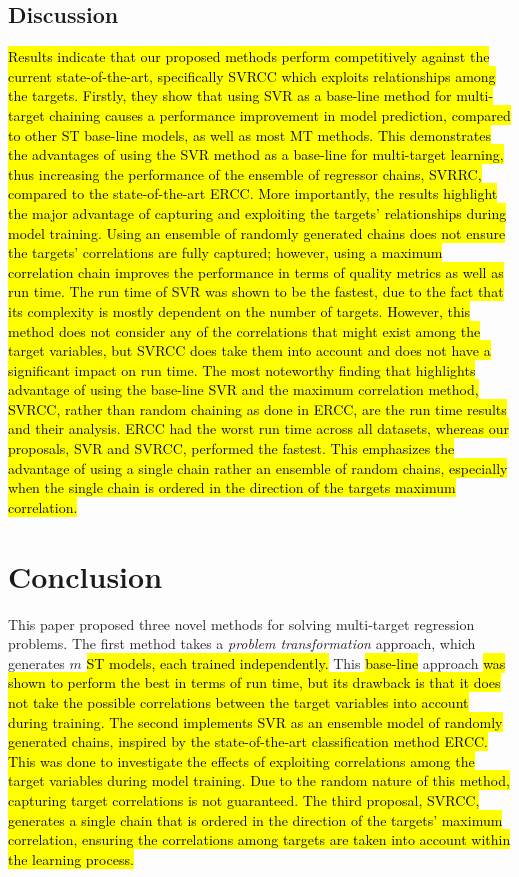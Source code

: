 \documentclass[preprint,12pt]{elsarticle}
\begin{document}
\subsection{Discussion}\label{sec:discussion}
\hl{Results indicate that our proposed methods perform competitively against the current state-of-the-art, specifically SVRCC which exploits relationships among the targets. Firstly, they show that using SVR as a base-line method for multi-target chaining causes a performance improvement in model prediction, compared to other ST base-line models, as well as most MT methods. This demonstrates the advantages of using the SVR method as a base-line for multi-target learning, thus increasing the performance of the ensemble of regressor chains, SVRRC, compared to the state-of-the-art ERCC. More importantly, the results highlight the major advantage of capturing and exploiting the targets' relationships during model training. Using an ensemble of randomly generated chains does not ensure the targets' correlations are fully captured; however, using a maximum correlation chain improves the performance in terms of quality metrics as well as run time. The run time of SVR was shown to be the fastest, due to the fact that its complexity is mostly dependent on the number of targets. However, this method does not consider any of the correlations that might exist among the target variables, but SVRCC does take them into account and does not have a significant impact on run time. The most noteworthy finding that highlights advantage of using the base-line SVR and the maximum correlation method, SVRCC, rather than random chaining as done in ERCC, are the run time results and their analysis. ERCC had the worst run time across all datasets, whereas our proposals, SVR and SVRCC, performed the fastest. This emphasizes the advantage of using a single chain rather an ensemble of random chains, especially when the single chain is ordered in the direction of the targets maximum correlation.}

\section{Conclusion}\label{sec:conclusions}
This paper proposed three novel methods for solving multi-target regression problems. The first method takes a \textit{problem transformation} approach, which generates $m$ \hl{ST models, each trained independently.} This \hl{base-line} approach \hl{was shown to perform the best in terms of run time, but its drawback  is that it does not take the possible correlations between the target variables into account during training. The second implements SVR as an ensemble model of randomly generated chains, inspired by the state-of-the-art classification method ERCC. This was done to investigate the effects of exploiting correlations among the target variables during model training. Due to the random nature of this method, capturing target correlations is not guaranteed. The third proposal, SVRCC, generates a single chain that is ordered in the direction of the targets' maximum correlation, ensuring the correlations among targets are taken into account within the learning process.}
\end{document}
